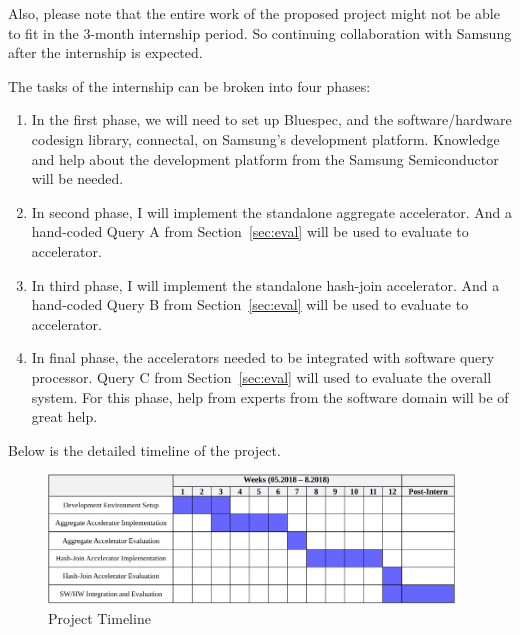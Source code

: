 \documentclass{article}
\begin{document}
Also, please note that the entire work of the proposed project might not be able to fit in the 3-month internship period.
So continuing collaboration with Samsung after the internship is expected.

The tasks of the internship can be broken into four phases:

\begin{enumerate}
\item In the first phase, we will need to set up Bluespec, and the software/hardware codesign library, connectal, on Samsung's development
  platform.
  Knowledge and help about the development platform from the Samsung Semiconductor will be needed.
\item In second phase, I will implement the standalone aggregate accelerator.
  And a hand-coded Query A from Section~\ref{sec:eval} will be used to evaluate to accelerator.
\item In third phase, I will implement the standalone hash-join accelerator.
  And a hand-coded Query B from Section~\ref{sec:eval} will be used to evaluate to accelerator.
\item In final phase, the accelerators needed to be integrated with software query processor.
  Query C from Section~\ref{sec:eval} will used to evaluate the overall system.
  For this phase, help from experts from the software domain will be of great help.
\end{enumerate}

Below is the detailed timeline of the project.

\begin{figure}[h]
    \centering
    \includegraphics[width=0.96\textwidth]{figures/milestone-crop.pdf}
    \caption{Project Timeline}
    \label{fig:milestone}
    \vspace{-10pt}
\end{figure}
\end{document}
